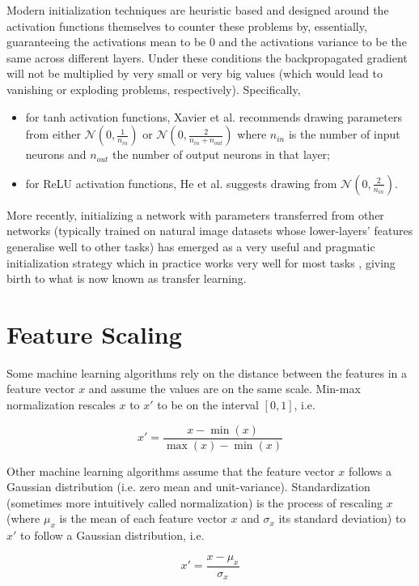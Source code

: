 Modern initialization techniques are heuristic based and designed around the activation functions themselves to counter these problems by, essentially, guaranteeing the activations mean to be $0$ and the activations variance to be the same across different layers. Under these conditions the backpropagated gradient will not be multiplied by very small or very big values (which would lead to vanishing or exploding problems, respectively). Specifically,

\begin{itemize}
    \item for tanh activation functions, Xavier et al.\cite{xavierinit} recommends drawing parameters from either $\mathcal{N}(0, \frac{1}{n_{in}})$ or $\mathcal{N}(0, \frac{2}{n_{in}+n_{out}})$ where $n_{in}$ is the number of input neurons and $n_{out}$ the number of output neurons in that layer;
    \item for ReLU activation functions, He et al.\cite{heinit} suggests drawing from $\mathcal{N}(0, \frac{2}{n_{in}})$.
\end{itemize}

More recently, initializing a network with parameters transferred from other networks (typically trained on natural image datasets whose lower-layers' features generalise well to other tasks) has emerged as a very useful and pragmatic initialization strategy which in practice works very well for most tasks \cite{howtransferable}, giving birth to what is now known as transfer learning.

\section{Feature Scaling}

Some machine learning algorithms rely on the distance between the features in a feature vector $x$ and assume the values are on the same scale. Min-max normalization rescales $x$ to $x'$ to be on the interval $[0, 1]$, i.e.

$$
x' = \frac{x - \min{(x)}}{\max{(x)} - \min{(x)}}
$$

Other machine learning algorithms assume that the feature vector $x$ follows a Gaussian distribution (i.e. zero mean and unit-variance). Standardization (sometimes more intuitively called normalization) is the process of rescaling $x$ (where $\mu_x$ is the mean of each feature vector $x$ and $\sigma_x$ its standard deviation) to $x'$ to follow a Gaussian distribution, i.e.

$$
x' = \frac{x - \mu_x}{\sigma_x}
$$

